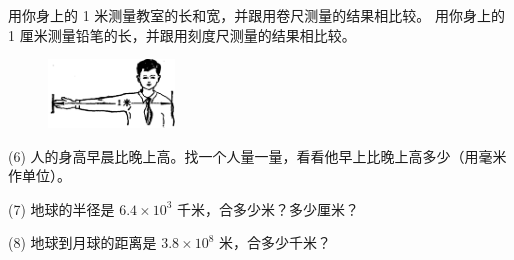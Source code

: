 用你身上的 1 米测量教室的长和宽，并跟用卷尺测量的结果相比较。
用你身上的 1 厘米测量铅笔的长，并跟用刻度尺测量的结果相比较。

\begin{figure}[htbp]
    \centering
    \includegraphics[width=0.3\textwidth]{../pic/czwl1-ch1-6}
    \caption{}\label{fig:1-6}
\end{figure}

(6) 人的身高早晨比晚上高。找一个人量一量，看看他早上比晚上高多少（用毫米作单位）。

(7) 地球的半径是 $6.4 \times 10^3$ 千米，合多少米？多少厘米？

(8) 地球到月球的距离是 $3.8 \times 10^8$ 米，合多少千米？

